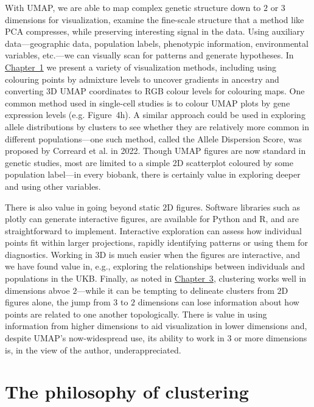 With UMAP, we are able to map complex genetic structure down to $2$ or $3$ dimensions for visualization, examine the fine-scale structure that a method like PCA compresses, while preserving interesting signal in the data. Using auxiliary data---geographic data, population labels, phenotypic information, environmental variables, etc.---we can visually scan for patterns and generate hypotheses. In \hyperref[chap:chapter1]{Chapter~1} we present a variety of visualization methods, including using colouring points by admixture levels to uncover gradients in ancestry and converting 3D UMAP coordinates to RGB colour levels for colouring maps. One common method used in single-cell studies is to colour UMAP plots by gene expression levels (e.g. \citep{jessa_stalled_2019} Figure~4h). A similar approach could be used in exploring allele distributions by clusters to see whether they are relatively more common in different populations---one such method, called the Allele Dispersion Score, was proposed by Correard et al. in 2022\citep{correard_allele_2022}. Though UMAP figures are now standard in genetic studies, most are limited to a simple 2D scatterplot coloured by some population label---in every biobank, there is certainly value in exploring deeper and using other variables.

There is also value in going beyond static $2$D figures. Software libraries such as plotly\citep{plotly} can generate interactive figures, are available for Python and R, and are straightforward to implement. Interactive exploration can assess how individual points fit within larger projections, rapidly identifying patterns or using them for diagnostics. Working in $3$D is much easier when the figures are interactive, and we have found value in, e.g., exploring the relationships between individuals and populations in the UKB. Finally, as noted in \hyperref[chap:chapter3]{Chapter~3}, clustering works well in dimensions abvoe $2$---while it can be tempting to delineate clusters from $2$D figures alone, the jump from $3$ to $2$ dimensions can lose information about how points are related to one another topologically. There is value in using information from higher dimensions to aid visualization in lower dimensions and, despite UMAP's now-widespread use, its ability to work in $3$ or more dimensions is, in the view of the author, underappreciated.

\clearpage

\section{The philosophy of clustering}

